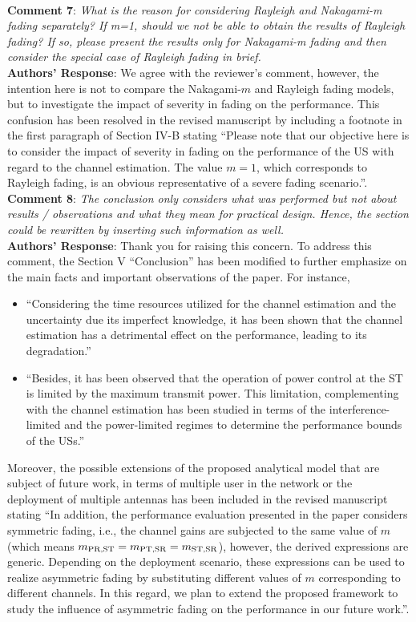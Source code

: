 \documentclass[12pt,a4wide,peerreview]{IEEEtran}
\newcommand{\tc}[1]{#1}
\begin{document}
\\
\textbf{\tc{Comment 7}}: 
\textit{
What is the reason for considering Rayleigh and Nakagami-m fading separately? If m=1, should we not be able to obtain the results of Rayleigh fading? If so, please present the results only for Nakagami-m fading and then consider the special case of Rayleigh fading in brief. 
}
\\
\textbf{Authors' Response}:
We agree with the reviewer's comment, however, the intention here is not to compare the Nakagami-$m$ and Rayleigh fading models, but to investigate the impact of severity in fading on the performance. %
This confusion has been resolved in the revised manuscript by including a footnote in the first paragraph of Section IV-B stating ``Please note that our objective here is to consider the impact of severity in fading on the performance of the US with regard to the channel estimation. The value $m = 1$, which corresponds to Rayleigh fading, is an obvious representative of a severe fading scenario.''. 
\\
\textbf{\tc{Comment 8}}: 
\textit{
The conclusion only considers what was performed but not about results / observations and what they mean for practical design. Hence, the section could be rewritten by inserting such information as well.
}
\\
\textbf{Authors' Response}:
Thank you for raising this concern. To address this comment, the Section V ``Conclusion'' has been modified to further emphasize on the main facts and important observations of the paper. For instance,
\begin{itemize}
\item ``Considering the time resources utilized for the channel estimation and the uncertainty due its imperfect knowledge, it has been shown that the channel estimation has a detrimental effect on the performance, leading to its degradation.''
\item ``Besides, it has been observed that the operation of power control at the ST is limited by the maximum transmit power. This limitation, complementing with the channel estimation has been studied in terms of the interference-limited and the power-limited regimes to determine the performance bounds of the USs.''
\end{itemize} 
Moreover, the possible extensions of the proposed analytical model that are subject of future work, in terms of multiple user in the network or the deployment of multiple antennas has been included in the revised manuscript stating ``In addition, the performance evaluation presented in the paper considers symmetric fading, i.e., the channel gains are subjected to the same value of $m$ (which means $m_{\text{PR,ST}} = m_{\text{PT,SR}} = m_{\text{ST,SR}}$), however, the derived expressions are generic. Depending on the deployment scenario, these expressions can be used to realize asymmetric fading by substituting different values of $m$ corresponding to different channels. In this regard, we plan to extend the proposed framework to study the influence of asymmetric fading on the performance in our future work.''.
\end{document}
